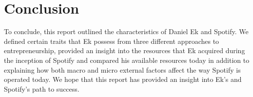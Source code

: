 \section{Conclusion}
To conclude, this report outlined the characteristics of Daniel Ek and Spotify. We defined certain traits that Ek possess from three different approaches to entrepreneurship, provided an insight into the resources that Ek acquired during the inception of Spotify and compared his available resources today in addition to explaining how both macro and micro external factors affect the way Spotify is operated today. We hope that this report has provided an insight into Ek's and Spotify's path to success.